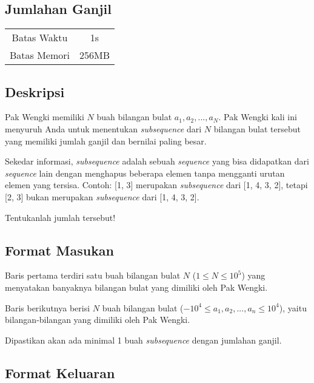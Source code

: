 \documentclass{article}
\begin{document}
\begin{center}
    \section*{Jumlahan Ganjil}

    \begin{tabular}{ | c c | }
        \hline
        Batas Waktu  & 1s \\    %
        Batas Memori & 256MB \\  %
        \hline
    \end{tabular}
\end{center}

\subsection*{Deskripsi}

Pak Wengki memiliki $N$ buah bilangan bulat $a_1, a_2, ..., a_N$. Pak Wengki kali ini menyuruh Anda untuk menentukan \textit{subsequence} dari $N$ bilangan bulat tersebut yang memiliki jumlah ganjil dan bernilai paling besar. 

Sekedar informasi, \textit{subsequence} adalah sebuah \textit{sequence} yang bisa didapatkan dari \textit{sequence} lain dengan menghapus beberapa elemen tanpa mengganti urutan elemen yang tersisa.
Contoh: [1, 3] merupakan \textit{subsequence} dari [1, 4, 3, 2], tetapi [2, 3] bukan merupakan \textit{subsequence} dari [1, 4, 3, 2].

Tentukanlah jumlah tersebut!

\subsection*{Format Masukan}

Baris pertama terdiri satu buah bilangan bulat $N$ ($1 \leq N \leq 10^5$) yang menyatakan banyaknya bilangan bulat yang dimiliki oleh Pak Wengki.

Baris berikutnya berisi $N$ buah bilangan bulat ($-10^4 \leq a_1, a_2, ..., a_n \leq 10^4$), yaitu bilangan-bilangan yang dimiliki oleh Pak Wengki.

Dipastikan akan ada minimal 1 buah \textit{subsequence} dengan jumlahan ganjil.

\subsection*{Format Keluaran}
\end{document}
